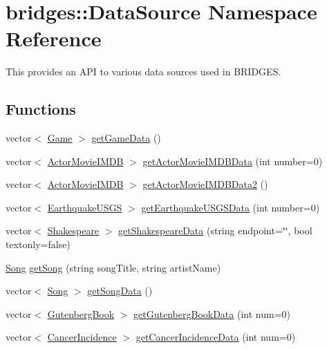 \hypertarget{namespacebridges_1_1_data_source}{}\section{bridges\+:\+:Data\+Source Namespace Reference}
\label{namespacebridges_1_1_data_source}


This provides an A\+PI to various data sources used in B\+R\+I\+D\+G\+ES.  


\subsection*{Functions}
\begin{DoxyCompactItemize}
\item 
vector$<$ \mbox{\hyperlink{classbridges_1_1_game}{Game}} $>$ \mbox{\hyperlink{namespacebridges_1_1_data_source_a96a28cc7f2a6013fe09b07cc53c7432f}{get\+Game\+Data}} ()
\item 
vector$<$ \mbox{\hyperlink{classbridges_1_1_actor_movie_i_m_d_b}{Actor\+Movie\+I\+M\+DB}} $>$ \mbox{\hyperlink{namespacebridges_1_1_data_source_ac43ccd8f2a325cf2f057a5ee7f0b73f1}{get\+Actor\+Movie\+I\+M\+D\+B\+Data}} (int number=0)
\item 
vector$<$ \mbox{\hyperlink{classbridges_1_1_actor_movie_i_m_d_b}{Actor\+Movie\+I\+M\+DB}} $>$ \mbox{\hyperlink{namespacebridges_1_1_data_source_a022113cbb28042171d088250e85098d0}{get\+Actor\+Movie\+I\+M\+D\+B\+Data2}} ()
\item 
vector$<$ \mbox{\hyperlink{classbridges_1_1_earthquake_u_s_g_s}{Earthquake\+U\+S\+GS}} $>$ \mbox{\hyperlink{namespacebridges_1_1_data_source_ae9f6a40dae8b8a15ebe43aca34931b43}{get\+Earthquake\+U\+S\+G\+S\+Data}} (int number=0)
\item 
vector$<$ \mbox{\hyperlink{classbridges_1_1_shakespeare}{Shakespeare}} $>$ \mbox{\hyperlink{namespacebridges_1_1_data_source_a2aa0d50a0b7bf8cc47c4f92dd1986dc6}{get\+Shakespeare\+Data}} (string endpoint=\char`\"{}\char`\"{}, bool textonly=false)
\item 
\mbox{\hyperlink{classbridges_1_1_song}{Song}} \mbox{\hyperlink{namespacebridges_1_1_data_source_a284c9d572415b67df6989ab8ab97d0e2}{get\+Song}} (string song\+Title, string artist\+Name)
\item 
vector$<$ \mbox{\hyperlink{classbridges_1_1_song}{Song}} $>$ \mbox{\hyperlink{namespacebridges_1_1_data_source_a325b6f25041e833bc2fd561bd2c2ee6e}{get\+Song\+Data}} ()
\item 
vector$<$ \mbox{\hyperlink{classbridges_1_1_gutenberg_book}{Gutenberg\+Book}} $>$ \mbox{\hyperlink{namespacebridges_1_1_data_source_a8146b00565286727e8206e377d9ff5bd}{get\+Gutenberg\+Book\+Data}} (int num=0)
\item 
vector$<$ \mbox{\hyperlink{classbridges_1_1_cancer_incidence}{Cancer\+Incidence}} $>$ \mbox{\hyperlink{namespacebridges_1_1_data_source_a4f8990ea0e793a6464d95cb82f57c8f9}{get\+Cancer\+Incidence\+Data}} (int num=0)
\end{DoxyCompactItemize}


